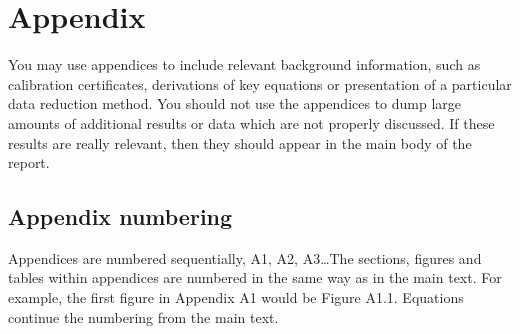 \chapter{Appendix}
You may use appendices to include relevant background information, such as calibration certificates, derivations of key equations or presentation of a particular data reduction method. You should not use the appendices to dump large amounts of additional results or data which are not properly discussed. If these results are really relevant, then they should appear in the main body of the report.

\section{Appendix numbering}
Appendices are numbered sequentially, A1, A2, A3\ldots The sections, figures and tables within appendices are numbered in the same way as in the main text. For example, the first figure in Appendix A1 would be Figure A1.1. Equations continue the numbering from the main text.
